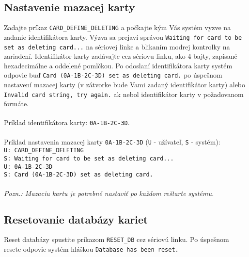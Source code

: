 \documentclass[a4paper]{article}
\begin{document}
\subsection{Nastavenie mazacej karty}
Zadajte príkaz \texttt{CARD\_DEFINE\_DELETING} a počkajte kým Vás systém vyzve na zadanie identifikátora karty. Výzva sa prejaví správou \texttt{Waiting for card to be set as deleting card...} na sériovej linke a blikaním modrej kontrolky na zariadení. Identifikátor karty zadávajte cez sériovu linku, ako 4 bajty, zapísané hexadecimálne a oddelené pomlčkou. Po odoslaní identifikátora karty systém odpovie buď \texttt{Card (0A-1B-2C-3D) set as deleting card.} po úspešnom nastavení mazacej karty (v zátvorke bude Vami zadaný identifikátor karty) alebo \texttt{Invalid card string, try again.} ak nebol identifikátor karty v požadovanom formáte. 
\\\\
Príklad identifikátora karty: \texttt{0A-1B-2C-3D}.
\\\\
Príklad nastavenia mazacej karty \texttt{0A-1B-2C-3D} (\texttt{U} - užívateľ, \texttt{S} - systém):\\
\texttt{U: CARD\_DEFINE\_DELETING}\\
\texttt{S: Waiting for card to be set as deleting card...}\\
\texttt{U: 0A-1B-2C-3D}\\
\texttt{S: Card (0A-1B-2C-3D) set as deleting card.}\\
\\
\textit{Pozn.: Mazaciu kartu je potrebné nastaviť po každom reštarte systému.}

\subsection{Resetovanie databázy kariet}
Reset databázy spustite príkazom \texttt{RESET\_DB} cez sériovú linku. Po úspešnom resete odpovie systém hláškou \texttt{Database has been reset.}

\end{document}
